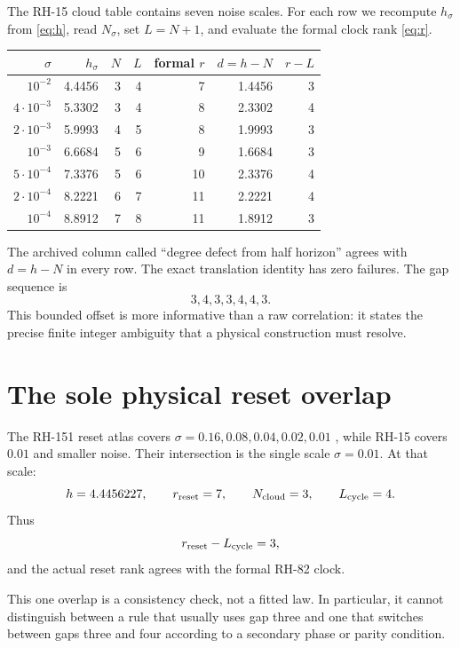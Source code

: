\documentclass[12pt]{article}
\theoremstyle{remark}
\begin{document}
The RH-15 cloud table contains seven noise scales.  For each row we recompute
$h_\sigma$ from \eqref{eq:h}, read $N_\sigma$, set $L=N+1$, and evaluate the
formal clock rank \eqref{eq:r}.

\begin{center}
\small
\begin{tabular}{rrrrrrr}
\toprule
$\sigma$ & $h_\sigma$ & $N$ & $L$ & formal $r$ & $d=h-N$ & $r-L$\\
\midrule
$10^{-2}$ & 4.4456 & 3 & 4 & 7 & 1.4456 & 3\\
$4\cdot10^{-3}$ & 5.3302 & 3 & 4 & 8 & 2.3302 & 4\\
$2\cdot10^{-3}$ & 5.9993 & 4 & 5 & 8 & 1.9993 & 3\\
$10^{-3}$ & 6.6684 & 5 & 6 & 9 & 1.6684 & 3\\
$5\cdot10^{-4}$ & 7.3376 & 5 & 6 & 10 & 2.3376 & 4\\
$2\cdot10^{-4}$ & 8.2221 & 6 & 7 & 11 & 2.2221 & 4\\
$10^{-4}$ & 8.8912 & 7 & 8 & 11 & 1.8912 & 3\\
\bottomrule
\end{tabular}
\end{center}

The archived column called ``degree defect from half horizon'' agrees with
$d=h-N$ in every row.  The exact translation identity has zero failures.
The gap sequence is
\[
 3,4,3,3,4,4,3.
\]
This bounded offset is more informative than a raw correlation: it states the
precise finite integer ambiguity that a physical construction must resolve.

\section{The sole physical reset overlap}

The RH-151 reset atlas covers
$\sigma=0.16,0.08,0.04,0.02,0.01$ \citep{WangRH151}, while RH-15 covers
$0.01$ and smaller noise.  Their intersection is the single scale
$\sigma=0.01$.  At that scale:
\[
 h=4.4456227,
 \qquad
 r_{\rm reset}=7,
 \qquad
 N_{\rm cloud}=3,
 \qquad
 L_{\rm cycle}=4.
\]
Thus
\[
 r_{\rm reset}-L_{\rm cycle}=3,
\]
and the actual reset rank agrees with the formal RH-82 clock.

This one overlap is a consistency check, not a fitted law.  In particular,
it cannot distinguish between a rule that usually uses gap three and one that
switches between gaps three and four according to a secondary phase or parity
condition.
\end{document}
